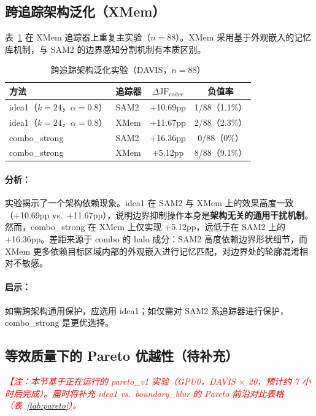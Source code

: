 \documentclass[UTF8,a4paper,12pt]{ctexart}
\begin{document}
\subsection{跨追踪架构泛化（XMem）}

表~\ref{tab:xmem} 在 XMem \cite{cheng2022xmem} 追踪器上重复主实验（$n=88$）。XMem 采用基于外观嵌入的记忆库机制，与 SAM2 的边界感知分割机制有本质区别。

\begin{table}[H]
\centering
\caption{跨追踪架构泛化实验（DAVIS，$n=88$）}
\label{tab:xmem}
\begin{tabular}{llcc}
\toprule
方法 & 追踪器 & $\Delta\text{JF}_{\text{codec}}$ & 负值率 \\
\midrule
idea1（$k=24$，$\alpha=0.8$） & SAM2  & +10.69pp & 1/88（1.1\%）  \\
idea1（$k=24$，$\alpha=0.8$） & XMem  & +11.67pp & 2/88（2.3\%）  \\
combo\_strong                 & SAM2  & +16.36pp & 0/88（0\%）    \\
combo\_strong                 & XMem  & +5.12pp  & 8/88（9.1\%）  \\
\bottomrule
\end{tabular}
\end{table}

\paragraph{分析：}实验揭示了一个架构依赖现象。idea1 在 SAM2 与 XMem 上的效果高度一致（+10.69pp vs.\ +11.67pp），说明边界抑制操作本身是\textbf{架构无关的通用干扰机制}。然而，combo\_strong 在 XMem 上仅实现 +5.12pp，远低于在 SAM2 上的 +16.36pp。差距来源于 combo 的 halo 成分：SAM2 高度依赖边界形状细节，而 XMem 更多依赖目标区域内部的外观嵌入进行记忆匹配，对边界处的轮廓混淆相对不敏感。

\paragraph{启示：}如需跨架构通用保护，应选用 idea1；如仅需对 SAM2 系追踪器进行保护，combo\_strong 是更优选择。

\subsection{等效质量下的 Pareto 优越性（待补充）}

\noindent\textcolor{red}{\textit{【注：本节基于正在运行的 pareto\_v1 实验（GPU0，DAVIS $\times$ 20，预计约 7 小时后完成）。届时将补充 idea1 vs.\ boundary\_blur 的 Pareto 前沿对比表格（表~\ref{tab:pareto}）。}}
\end{document}
